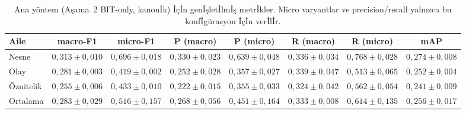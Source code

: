 \begin{table}[t]
  \caption{Ana yöntem (Aşama~2 BIT-only, kanon{\footnotesize İ}k)
    {\footnotesize İ}ç{\footnotesize İ}n gen{\footnotesize İ}şlet{\footnotesize İ}lm{\footnotesize İ}ş
    metr{\footnotesize İ}kler. Micro varyantlar ve precision/recall
    yalnızca bu konf{\footnotesize İ}gürasyon {\footnotesize İ}ç{\footnotesize İ}n
    ver{\footnotesize İ}l{\footnotesize İ}r.}
  \label{tab:main-extended}
  \centering
  \footnotesize
  \setlength{\tabcolsep}{4pt}
  \begin{tabular}{lccccccc}
    \toprule
    Aile     & macro-F1 & micro-F1 & P (macro) & P (micro) & R (macro) & R (micro) & mAP \\
    \midrule
    Nesne    & $0{,}313 \pm 0{,}010$ & $0{,}696 \pm 0{,}018$ & $0{,}330 \pm 0{,}023$ & $0{,}639 \pm 0{,}048$ & $0{,}336 \pm 0{,}034$ & $0{,}768 \pm 0{,}028$ & $0{,}274 \pm 0{,}008$ \\
    Olay     & $0{,}281 \pm 0{,}003$ & $0{,}419 \pm 0{,}002$ & $0{,}252 \pm 0{,}028$ & $0{,}357 \pm 0{,}027$ & $0{,}339 \pm 0{,}047$ & $0{,}513 \pm 0{,}065$ & $0{,}252 \pm 0{,}004$ \\
    Öznitelik & $0{,}255 \pm 0{,}006$ & $0{,}433 \pm 0{,}010$ & $0{,}222 \pm 0{,}015$ & $0{,}355 \pm 0{,}033$ & $0{,}324 \pm 0{,}042$ & $0{,}562 \pm 0{,}054$ & $0{,}241 \pm 0{,}009$ \\
    \midrule
    Ortalama & $0{,}283 \pm 0{,}029$ & $0{,}516 \pm 0{,}157$ & $0{,}268 \pm 0{,}056$ & $0{,}451 \pm 0{,}164$ & $0{,}333 \pm 0{,}008$ & $0{,}614 \pm 0{,}135$ & $0{,}256 \pm 0{,}017$ \\
    \bottomrule
  \end{tabular}
\end{table}
